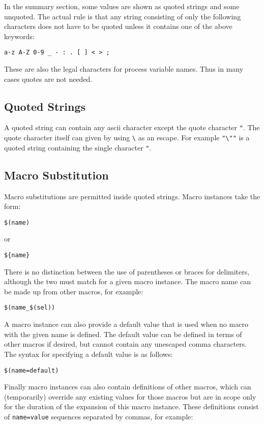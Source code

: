 In the summary section, some values are shown as quoted strings and some unquoted. The actual rule is that any string 
consisting of only the following characters does not have to be quoted unless it contains one of the above keywords:

\begin{verbatim}a-z A-Z 0-9 _ - : . [ ] < > ;
\end{verbatim}These are also the legal characters for process variable names. Thus in many cases quotes are not needed.

\subsection{Quoted Strings}

A quoted string can contain any ascii character except the quote character \verb|"|. The quote character itself can given by using \verb|\| as an escape. For example \verb|"\""| is a quoted string containing the single character \verb|"|.

\subsection{Macro Substitution}

Macro substitutions are permitted inside quoted strings. Macro instances take the form:

\begin{verbatim}$(name)
\end{verbatim}or

\begin{verbatim}${name}
\end{verbatim}There is no distinction between the use of parentheses or braces for delimiters, although the two must match for a given 
macro instance. The macro name can be made up from other macros, for example:

\begin{verbatim}$(name_$(sel))
\end{verbatim}A macro instance can also provide a default value that is used when no macro with the given name is defined. The default 
value can be defined in terms of other macros if desired, but cannot contain any unescaped comma characters. The syntax 
for specifying a default value is as follows:

\begin{verbatim}$(name=default)
\end{verbatim}Finally macro instances can also contain definitions of other macros, which can (temporarily) override any existing values 
for those macros but are in scope only for the duration of the expansion of this macro instance. These definitions consist 
of \verb|name=value| sequences separated by commas, for example:

